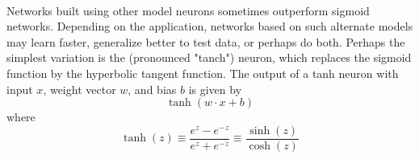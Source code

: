 \paragraph{}
Networks built using other model neurons sometimes outperform sigmoid networks. Depending on the application, networks based on such alternate models may learn faster, generalize better to test data, or perhaps do both. Perhaps the simplest variation is the  (pronounced "tanch") neuron, which replaces the sigmoid function by the hyperbolic tangent function. The output of a tanh neuron with input $x$, weight vector $w$, and bias $b$ is given by
\begin{equation}
\tanh (w \cdot x + b)
\end{equation}
where
\begin{equation}
\tanh(z) \equiv \frac{e^z - e^{-z}}{e^z + e^{-z}} \equiv \frac{\sinh(z)}{\cosh(z)}
\end{equation}

